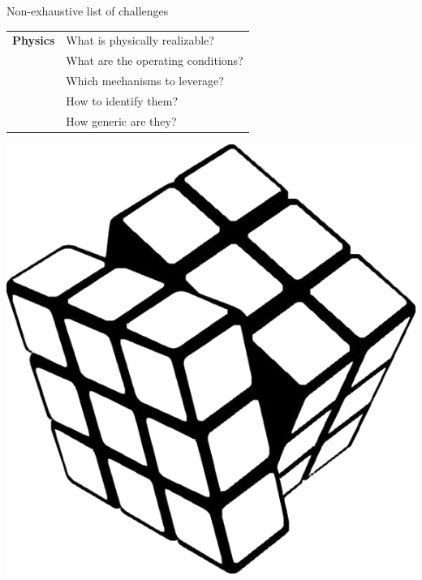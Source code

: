 \documentclass[aspectratio=169,compress,12pt,dvipsnames]{beamer}
\begin{document}
\begin{frame}[t, c]{Non-exhaustive list of challenges}
    \vfill
    \begin{minipage}{.68\textwidth}
        \centering
        \begin{tabular}{rl}
            \textbf{Physics}    &   What is physically realizable?      \\
                                &   What are the operating conditions?  \\
                                &   Which mechanisms to leverage?       \\
                                &   How to identify them?               \\
                                &   How generic are they?
        \end{tabular}
    \end{minipage}%
    \hfill
    \begin{minipage}{.28\textwidth}
        \centering
        \includegraphics[width=\textwidth]{rubik_cube.png}
    \end{minipage}
    \vfill
\end{frame}
\end{document}
